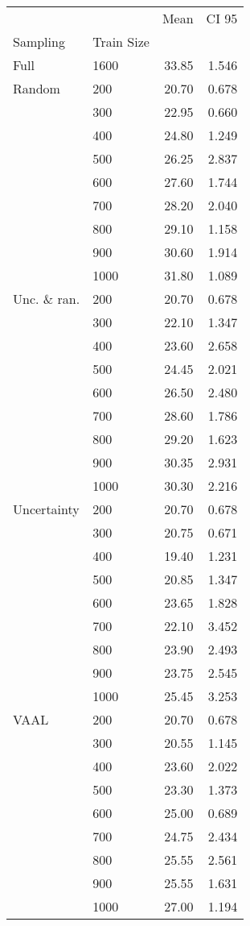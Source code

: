 \begin{tabular}{llrr}
\toprule
     &      &   Mean &  CI 95 \\
Sampling & Train Size &        &        \\
\midrule
Full & 1600 &  33.85 &  1.546 \\
Random & 200  &  20.70 &  0.678 \\
     & 300  &  22.95 &  0.660 \\
     & 400  &  24.80 &  1.249 \\
     & 500  &  26.25 &  2.837 \\
     & 600  &  27.60 &  1.744 \\
     & 700  &  28.20 &  2.040 \\
     & 800  &  29.10 &  1.158 \\
     & 900  &  30.60 &  1.914 \\
     & 1000 &  31.80 &  1.089 \\
Unc. \& ran. & 200  &  20.70 &  0.678 \\
     & 300  &  22.10 &  1.347 \\
     & 400  &  23.60 &  2.658 \\
     & 500  &  24.45 &  2.021 \\
     & 600  &  26.50 &  2.480 \\
     & 700  &  28.60 &  1.786 \\
     & 800  &  29.20 &  1.623 \\
     & 900  &  30.35 &  2.931 \\
     & 1000 &  30.30 &  2.216 \\
Uncertainty & 200  &  20.70 &  0.678 \\
     & 300  &  20.75 &  0.671 \\
     & 400  &  19.40 &  1.231 \\
     & 500  &  20.85 &  1.347 \\
     & 600  &  23.65 &  1.828 \\
     & 700  &  22.10 &  3.452 \\
     & 800  &  23.90 &  2.493 \\
     & 900  &  23.75 &  2.545 \\
     & 1000 &  25.45 &  3.253 \\
VAAL & 200  &  20.70 &  0.678 \\
     & 300  &  20.55 &  1.145 \\
     & 400  &  23.60 &  2.022 \\
     & 500  &  23.30 &  1.373 \\
     & 600  &  25.00 &  0.689 \\
     & 700  &  24.75 &  2.434 \\
     & 800  &  25.55 &  2.561 \\
     & 900  &  25.55 &  1.631 \\
     & 1000 &  27.00 &  1.194 \\
\bottomrule
\end{tabular}
